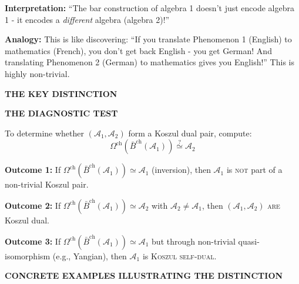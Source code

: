 \begin{remark}
\textbf{Interpretation:} ``The bar construction of algebra 1 doesn't just encode algebra 1 - it encodes a \emph{different} algebra (algebra 2)!''

\textbf{Analogy:} This is like discovering: ``If you translate Phenomenon 1 (English) to mathematics (French), you don't get back English - you get German! And translating Phenomenon 2 (German) to mathematics gives you English!'' This is highly non-trivial.

\medskip
\noindent\textbf{THE KEY DISTINCTION}

\begin{center}
\end{center}

\medskip
\noindent\textbf{THE DIAGNOSTIC TEST}

To determine whether $(\mathcal{A}_1, \mathcal{A}_2)$ form a Koszul dual pair, compute:
$$\Omega^{\text{ch}}(\bar{B}^{\text{ch}}(\mathcal{A}_1)) \stackrel{?}{\simeq} \mathcal{A}_2$$

\textbf{Outcome 1:} If $\Omega^{\text{ch}}(\bar{B}^{\text{ch}}(\mathcal{A}_1)) \simeq \mathcal{A}_1$ (inversion), then $\mathcal{A}_1$ is \textsc{not} part of a non-trivial Koszul pair.

\textbf{Outcome 2:} If $\Omega^{\text{ch}}(\bar{B}^{\text{ch}}(\mathcal{A}_1)) \simeq \mathcal{A}_2$ with $\mathcal{A}_2 \neq \mathcal{A}_1$, then $(\mathcal{A}_1, \mathcal{A}_2)$ \textsc{are} Koszul dual.

\textbf{Outcome 3:} If $\Omega^{\text{ch}}(\bar{B}^{\text{ch}}(\mathcal{A}_1)) \simeq \mathcal{A}_1$ but through non-trivial quasi-isomorphism (e.g., Yangian), then $\mathcal{A}_1$ is \textsc{Koszul self-dual}.

\medskip
\noindent\textbf{CONCRETE EXAMPLES ILLUSTRATING THE DISTINCTION}


\end{remark}
